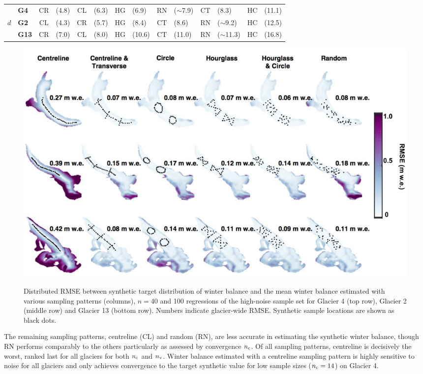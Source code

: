 \documentclass[twocolumn,letterpaper]{igs}
\begin{document}
\begin{table}[]
\begin{tabular}{clclclclclclcl}
\hline
                & \textbf{G4}   & \textcolor{CR}{CR}         & (4.8) & \textcolor{CL}{CL}         & (6.3) & \textcolor{HG}{HG}                 & (6.9)         & \textcolor{RN}{RN}         & ($\sim$7.9) & \textcolor{CT}{CT}         & (8.3) & \textcolor{HC}{HC} & (11.1) \\
$d$        & \textbf{G2}   & \textcolor{CL}{CL}         & (4.3) & \textcolor{CR}{CR}         & (5.7) & \textcolor{HG}{HG}                 & (8.4)         & \textcolor{CT}{CT} & (8.6)         & \textcolor{RN}{RN}                 & ($\sim$9.2) & \textcolor{HC}{HC} & (12.5) \\
                & \textbf{G13} & \textcolor{CR}{CR}         & (7.0) & \textcolor{CL}{CL}         & (8.0) & \textcolor{HG}{HG}                 & (10.6)         & \textcolor{CT}{CT} & (11.0)         & \textcolor{RN}{RN}                 & ($\sim$11.3) & \textcolor{HC}{HC} & (16.8)\\
\hline
\end{tabular}
\end{table}


\begin{figure}
	\centering
	\includegraphics[width =\textwidth]{Pulwicki_Fig4.pdf}\\
	\caption{Distributed RMSE between synthetic target distribution of winter balance and the mean winter balance estimated with various sampling patterns (columns), $n=40$ and 100 regressions of the high-noise sample set for Glacier 4 (top row), Glacier 2 (middle row) and Glacier 13 (bottom row). Numbers indicate glacier-wide RMSE. Synthetic sample locations are shown as black dots.}
	\label{fig:SynObsRMSEmap}
\end{figure}


The remaining sampling patterns, centreline (CL) and random (RN), are less accurate in estimating the synthetic winter balance, though RN performs comparably to the others particularly as assessed by convergence $n_{\rm c}$. 
Of all sampling patterns, centreline is decisively the worst, ranked last for all glaciers for both $n_{\rm c}$ and $n_{\rm v}$. Winter balance estimated with a centreline sampling pattern is highly sensitive to noise for all glaciers and only achieves convergence to the target synthetic value for low sample sizes ($n_{\rm c}=14$) on Glacier 4. 
\end{document}
